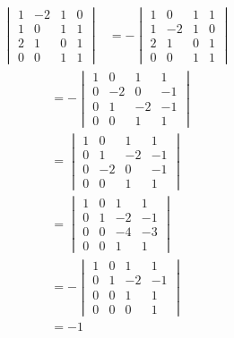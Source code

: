 \documentclass[../main.tex]{subfiles}
\begin{document}
\begin{align*}
    \begin{vmatrix}
        1 & -2 & 1 & 0 \\
        1 & 0 & 1 & 1 \\
        2 & 1 & 0 & 1 \\
        0 & 0 & 1 & 1
    \end{vmatrix} &= -\begin{vmatrix}
        1 & 0 & 1 & 1 \\
        1 & -2 & 1 & 0 \\
        2 & 1 & 0 & 1 \\
        0 & 0 & 1 & 1
    \end{vmatrix}
\end{align*}
\begin{align*}
    &= -\begin{vmatrix}
        1 & 0 & 1 & 1 \\
        0 & -2 & 0 & -1 \\
        0 & 1 & -2 & -1 \\
        0 & 0 & 1 & 1
    \end{vmatrix} \\
    &= \begin{vmatrix}
        1 & 0 & 1 & 1 \\
        0 & 1 & -2 & -1 \\
        0 & -2 & 0 & -1 \\
        0 & 0 & 1 & 1
    \end{vmatrix} \\
    &= \begin{vmatrix}
        1 & 0 & 1 & 1 \\
        0 & 1 & -2 & -1 \\
        0 & 0 & -4 & -3 \\
        0 & 0 & 1 & 1
    \end{vmatrix} \\
    &= -\begin{vmatrix}
        1 & 0 & 1 & 1 \\
        0 & 1 & -2 & -1 \\
        0 & 0 & 1 & 1 \\
        0 & 0 & 0 & 1
    \end{vmatrix} \\
    &= -1
\end{align*}
\end{document}
